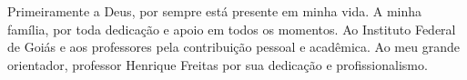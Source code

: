 \begin{agradecimentos}
Primeiramente a Deus, por sempre está presente em minha vida. A minha família, por toda dedicação e apoio em todos os momentos. Ao Instituto Federal de Goiás e aos professores pela contribuição pessoal e acadêmica. Ao meu grande orientador, professor Henrique Freitas por sua dedicação e profissionalismo.
\end{agradecimentos}